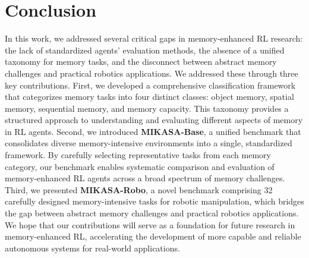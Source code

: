 \section{Conclusion}
In this work, we addressed several critical gaps in memory-enhanced RL research: the lack of standardized agents' evaluation methods, the absence of a unified taxonomy for memory tasks, and the disconnect between abstract memory challenges and practical robotics applications. 
We addressed these through three key contributions.
First, we developed a comprehensive classification framework that categorizes memory tasks into four distinct classes: object memory, spatial memory, sequential memory, and memory capacity. 
This taxonomy provides a structured approach to understanding and evaluating different aspects of memory in RL agents. 
Second, we introduced \textbf{MIKASA-Base}, a unified benchmark that consolidates diverse memory-intensive environments into a single, standardized framework. 
By carefully selecting representative tasks from each memory category, our benchmark enables systematic comparison and evaluation of memory-enhanced RL agents across a broad spectrum of memory challenges. 
Third, we presented \textbf{MIKASA-Robo}, a novel benchmark comprising 32 carefully designed memory-intensive tasks for robotic manipulation, which bridges the gap between abstract memory challenges and practical robotics applications.
We hope that our contributions will serve as a foundation for future research in memory-enhanced RL, accelerating the development of more capable and reliable autonomous systems for real-world applications.